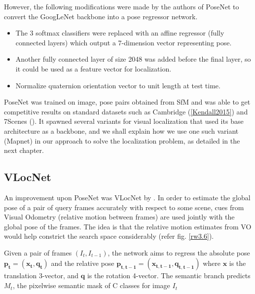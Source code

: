 However, the following modifications were made by the authors of PoseNet to convert the GoogLeNet backbone into a pose regressor network. 

\begin{itemize}
	\item The 3 softmax classifiers were replaced with an affine regressor (fully connected layers) which output a 7-dimension vector representing pose.\\
	
	\item Another fully connected layer of size 2048 was added before the final layer, so it could be used as a feature vector for localization. \\
	
	\item Normalize quaternion orientation vector to unit length at test time. \\ 
\end{itemize}

PoseNet was trained on image, pose pairs obtained from SfM and was able to get competitive results on standard datasets such as Cambridge (\ref{Kendall2015}) and 7Scenes (\cite{glocker2013}). It spawned several variants for visual localization that used its base architecture as a backbone, and we shall explain how we use one such variant (Mapnet) in our approach to solve the localization problem, as detailed in the next chapter. 

\subsection{VLocNet} %
An improvement upon PoseNet was VLocNet by \cite{Valada2018}. In order to estimate the global pose of a pair of query frames accurately with respect to some scene, cues from 
Visual Odometry (relative motion between frames) are used jointly with the global pose of the frames. The idea is that the relative motion estimates from VO would help constrict 
the search space considerably (refer fig. \ref{rw3.6}). 

Given a pair of frames $(I_t, I_{t-1})$, the network aims to regress the absolute pose $\mathbf{p_t} = \mathbf{(x_t, q_t)}$ and the relative pose 
$\mathbf{p_{t, t-1}} = \mathbf{(x_{t, t-1}, q_{t, t-1})}$ where $\mathbf{x}$ is the translation 3-vector, and $\mathbf{q}$ is the rotation 4-vector. The semantic 
branch predicts $M_t$, the pixelwise semantic mask of C classes for image $I_t$ 

